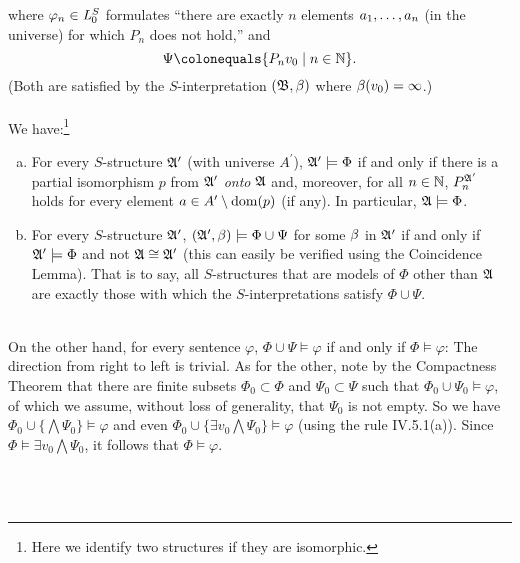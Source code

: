 \begin{enumerate}[1.]
\begin{enumerate}[(1)]
\[\]
where $\varphi_n \in \fstordlang[0]{S}$ formulates ``there are exactly $n$ elements $\seq[1]{a}{n}$ (in the universe) for which $P_n$ does not hold,'' and
\[
\Psi \colonequals \setm{P_n v_0}{n \in \nat}.
\]
(Both are satisfied by the $S$-interpretation $\intpp{\struct{B}}{\assgn}$ where $\assgn(v_0) = \infty$.)\\
\ \\
We have:\footnote{Here we identify two structures if they are isomorphic.}
\begin{enumerate}[(a)]
\item For every $S$-structure $\struct{A}^\prime$ (with universe $A^\prime$), $\struct{A}^\prime \models \Phi$ if and only if there is a partial isomorphism $p$ from $\struct{A}^\prime$ \emph{onto} $\struct{A}$ and, moreover, for all $n \in \nat$, $P_n^{\struct{A}^\prime}$ holds for every element $a \in A^\prime \setminus \dom{p}$ (if any). In particular, $\struct{A} \models \Phi$.
\item For every $S$-structure $\struct{A}^\prime$, $\intpp{\struct{A}^\prime}{\assgn} \models \Phi \cup \Psi$ for some $\assgn$ in $\struct{A}^\prime$ if and only if $\struct{A}^\prime \models \Phi$ and not $\struct{A} \iso \struct{A}^\prime$ (this can easily be verified using the Coincidence Lemma). That is to say, all $S$-structures that are models of $\Phi$ other than $\struct{A}$ are exactly those with which the $S$-interpretations satisfy $\Phi \cup \Psi$.
\end{enumerate}
\ \\
On the other hand, for every sentence $\varphi$, $\Phi \cup \Psi \models \varphi$ if and only if $\Phi \models \varphi$: The direction from right to left is trivial. As for the other, note by the Compactness Theorem that there are finite subsets $\Phi_0 \subset \Phi$ and $\Psi_0 \subset \Psi$ such that $\Phi_0 \cup \Psi_0 \models \varphi$, of which we assume, without loss of generality, that $\Psi_0$ is not empty. So we have $\Phi_0 \cup \{ \bigwedge\Psi_0 \} \models \varphi$ and even $\Phi_0 \cup  \{ \exists v_0 \bigwedge\Psi_0 \} \models \varphi$ (using the rule IV.5.1(a)). Since $\Phi \models \exists v_0 \bigwedge\Psi_0$, it follows that $\Phi \models \varphi$.
\end{enumerate}
\end{enumerate}
\
\\
\\
